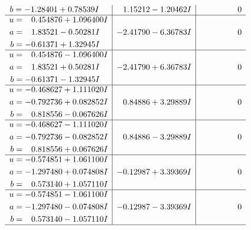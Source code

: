 \documentclass[1p]{elsarticle_modified}
\theoremstyle{definition}
\begin{document}
$$\begin{array}{c|c|c}
\begin{aligned}
b &= -1.28401 + 0.78539 I\end{aligned}
 & \phantom{-}1.15212 - 1.20462 I & \phantom{-0.000000 } 0 \\ \hline\begin{aligned}
u &= \phantom{-}0.454876 + 1.096400 I \\
a &= \phantom{-}1.83521 - 0.50281 I \\
b &= -0.61371 + 1.32945 I\end{aligned}
 & -2.41790 - 6.36783 I & \phantom{-0.000000 } 0 \\ \hline\begin{aligned}
u &= \phantom{-}0.454876 - 1.096400 I \\
a &= \phantom{-}1.83521 + 0.50281 I \\
b &= -0.61371 - 1.32945 I\end{aligned}
 & -2.41790 + 6.36783 I & \phantom{-0.000000 } 0 \\ \hline\begin{aligned}
u &= -0.468627 + 1.111020 I \\
a &= -0.792736 + 0.082852 I \\
b &= \phantom{-}0.818556 - 0.067626 I\end{aligned}
 & \phantom{-}0.84886 + 3.29889 I & \phantom{-0.000000 } 0 \\ \hline\begin{aligned}
u &= -0.468627 - 1.111020 I \\
a &= -0.792736 - 0.082852 I \\
b &= \phantom{-}0.818556 + 0.067626 I\end{aligned}
 & \phantom{-}0.84886 - 3.29889 I & \phantom{-0.000000 } 0 \\ \hline\begin{aligned}
u &= -0.574851 + 1.061100 I \\
a &= -1.297480 + 0.074808 I \\
b &= \phantom{-}0.573140 + 1.057110 I\end{aligned}
 & -0.12987 + 3.39369 I & \phantom{-0.000000 } 0 \\ \hline\begin{aligned}
u &= -0.574851 - 1.061100 I \\
a &= -1.297480 - 0.074808 I \\
b &= \phantom{-}0.573140 - 1.057110 I\end{aligned}
 & -0.12987 - 3.39369 I & \phantom{-0.000000 } 0\\
 \hline 
 \end{array}$$\newpage$$\begin{array}{c|c|c}  

\end{array}$$
\end{document}
